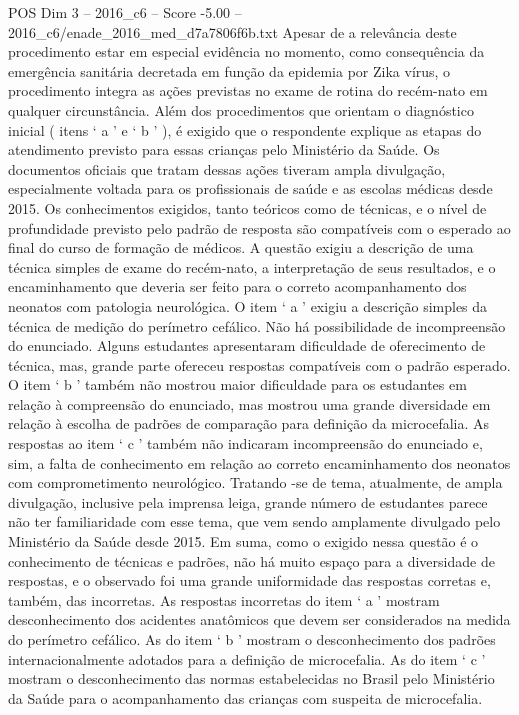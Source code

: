 \begin{textsample}{POS Dim 3 – 2016\_c6 – Score -5.00 – 2016\_c6/enade\_2016\_med\_d7a7806f6b.txt}
Apesar de a relevância deste procedimento estar em especial evidência no momento, como consequência da emergência sanitária decretada em função da epidemia por Zika vírus, o procedimento integra as ações previstas no exame de rotina do recém-nato em qualquer circunstância.
Além dos procedimentos que orientam o diagnóstico inicial ( itens ‘ a ’ e ‘ b ’ ), é exigido que o respondente explique as etapas do atendimento previsto para essas crianças pelo Ministério da Saúde.
Os documentos oficiais que tratam dessas ações tiveram ampla divulgação, especialmente voltada para os profissionais de saúde e as escolas médicas desde 2015.
Os conhecimentos exigidos, tanto teóricos como de técnicas, e o nível de profundidade previsto pelo padrão de resposta são compatíveis com o esperado ao final do curso de formação de médicos.
A questão exigiu a descrição de uma técnica simples de exame do recém-nato, a interpretação de seus resultados, e o encaminhamento que deveria ser feito para o correto acompanhamento dos neonatos com patologia neurológica.
O item ‘ a ’ exigiu a descrição simples da técnica de medição do perímetro cefálico.
Não há possibilidade de incompreensão do enunciado.
Alguns estudantes apresentaram dificuldade de oferecimento de técnica, mas, grande parte ofereceu respostas compatíveis com o padrão esperado.
O item ‘ b ’ também não mostrou maior dificuldade para os estudantes em relação à compreensão do enunciado, mas mostrou uma grande diversidade em relação à escolha de padrões de comparação para definição da microcefalia.
As respostas ao item ‘ c ’ também não indicaram incompreensão do enunciado e, sim, a falta de conhecimento em relação ao correto encaminhamento dos neonatos com comprometimento neurológico.
Tratando -se de tema, atualmente, de ampla divulgação, inclusive pela imprensa leiga, grande número de estudantes parece não ter familiaridade com esse tema, que vem sendo amplamente divulgado pelo Ministério da Saúde desde 2015.
Em suma, como o exigido nessa questão é o conhecimento de técnicas e padrões, não há muito espaço para a diversidade de respostas, e o observado foi uma grande uniformidade das respostas corretas e, também, das incorretas.
As respostas incorretas do item ‘ a ’ mostram desconhecimento dos acidentes anatômicos que devem ser considerados na medida do perímetro cefálico.
As do item ‘ b ’ mostram o desconhecimento dos padrões internacionalmente adotados para a definição de microcefalia.
As do item ‘ c ’ mostram o desconhecimento das normas estabelecidas no Brasil pelo Ministério da Saúde para o acompanhamento das crianças com suspeita de microcefalia.

\end{textsample}
